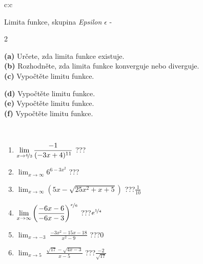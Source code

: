 \documentclass[10pt]{report}
\begin{document}
\begin{tabular}{c:c}
\begin{minipage}[c][104.5mm][t]{0.5\linewidth}
\begin{center}
\vspace{7mm}
{\huge Limita funkce, skupina \textit{Epsilon $\epsilon$} -}\\[5mm]
\begin{minipage}{0.95\linewidth}
\begin{center}
{\small \begin{multicols}{2} \raggedright
\textbf{(a)} Určete, zda limita funkce existuje. \\[1mm]
\textbf{(b)} Rozhodněte, zda limita funkce konverguje nebo diverguje. \\[1mm]
\textbf{(c)} Vypočtěte limitu funkce. \par \columnbreak
\textbf{(d)} Vypočtěte limitu funkce. \\[1mm]
\textbf{(e)} Vypočtěte limitu funkce. \\[1mm]
\textbf{(f)} Vypočtěte limitu funkce. \\[1mm]
\end{multicols}
}
\end{center}
\end{minipage}
\\[4mm]
\begin{minipage}{0.79\linewidth}
\begin{center}
\begin{varwidth}{\linewidth}
\begin{enumerate}
\normalsize
\item $\displaystyle\lim_{x\to\nicefrac{4}{3}}{\frac{-1}{(-3x+4)^{11}}}$\quad \dotfill\; ???\;\dotfill \quad {}
\item $\displaystyle\lim_{x\to\infty}{6^{6-3x^2}}$\quad \dotfill\; ???\;\dotfill \quad {}
\item $\displaystyle\lim_{x\to\infty}{\left(5x - \sqrt{25x^2+x+5}\right)}$\quad \dotfill\; ???\;\dotfill \quad $\frac{1}{10}$
\item $\displaystyle\lim_{x\to\infty}{\left( \frac{-6x-6}{-6x-3} \right)^{\nicefrac{x}{6}}}$\quad \dotfill\; ???\;\dotfill \quad $e^{\nicefrac{1}{4}}$
\item $\displaystyle\lim_{x\to -3}{\;\frac{-3x^2-15x-18}{x^2-9}}$\quad \dotfill\; ???\;\dotfill \quad $0$
\item $\displaystyle\lim_{x\to 5}{\;\frac{\sqrt{17}-\sqrt{4x-3}}{x-5}}$\quad \dotfill\; ???\;\dotfill \quad $\frac{-2}{\sqrt{17}}$

\end{enumerate}
\end{varwidth}
\end{center}
\end{minipage}
\end{center}
\end{minipage}
\end{tabular}
\end{document}
